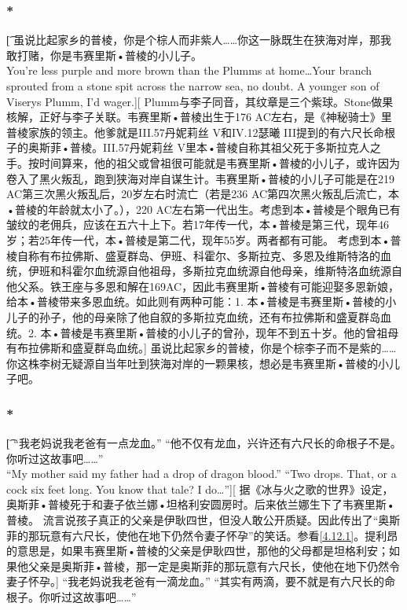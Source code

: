 \documentclass[12pt,a4paper]{article}
\begin{document}
\subsubsection{\color{red}*}\t[	
	虽说比起家乡的普棱，你是个棕人而非紫人……你这一脉既生在狭海对岸，那我敢打赌，你是韦赛里斯•普棱的小儿子。\\
	You're less purple and more brown than the Plumms at home\ldots Your branch sprouted from a stone spit across the narrow sea, no doubt. A younger son of Viserys Plumm, I'd wager.][
	Plumm与李子同音，其纹章是三个紫球。Stone做果核解，正好与李子关联。韦赛里斯•普棱出生于176 AC左右，是《神秘骑士》里普棱家族的领主。他爹就是III.57丹妮莉丝 V和IV.12瑟曦 III提到的有六尺长命根子的奥斯菲•普棱。III.57丹妮莉丝 V里本•普棱自称其祖父死于多斯拉克人之手。按时间算来，他的祖父或曾祖很可能就是韦赛里斯•普棱的小儿子，或许因为卷入了黑火叛乱，跑到狭海对岸自谋生计。韦赛里斯•普棱的小儿子可能是在219 AC第三次黑火叛乱后，20岁左右时流亡（若是236 AC第四次黑火叛乱后流亡，本•普棱的年龄就太小了。），220 AC左右第一代出生。考虑到本•普棱是个眼角已有皱纹的老佣兵，应该在五六十上下。若17年传一代，本•普棱是第三代，现年46岁；若25年传一代，本•普棱是第二代，现年55岁。两者都有可能。
	考虑到本•普棱自称有布拉佛斯、盛夏群岛、伊班、科霍尔、多斯拉克、多恩及维斯特洛的血统，伊班和科霍尔血统源自他祖母，多斯拉克血统源自他母亲，维斯特洛血统源自他父系。铁王座与多恩和解在169AC，因此韦赛里斯•普棱有可能迎娶多恩新娘，给本•普棱带来多恩血统。如此则有两种可能：1. 本•普棱是韦赛里斯•普棱的小儿子的孙子，他的母亲除了他自叙的多斯拉克血统，还有布拉佛斯和盛夏群岛血统。2. 本•普棱是韦赛里斯•普棱的小儿子的曾孙，现年不到五十岁。他的曾祖母有布拉佛斯和盛夏群岛血统。]
	虽说比起家乡的普棱，你是个棕李子而不是紫的……你这株李树无疑源自当年吐到狭海对岸的一颗果核，想必是韦赛里斯•普棱的小儿子吧。
	
\subsubsection{\color{red}*}\t[	
	“我老妈说我老爸有一点龙血。”	“他不仅有龙血，兴许还有六尺长的命根子不是。你听过这故事吧……”\\
	“My mother said my father had a drop of dragon blood.”
	“Two drops. That, or a cock six feet long. You know that tale? I do\ldots”][
	据《冰与火之歌的世界》设定，奥斯菲•普棱死于和妻子依兰娜•坦格利安圆房时。后来依兰娜生下了韦赛里斯•普棱。
	流言说孩子真正的父亲是伊耿四世，但没人敢公开质疑。因此传出了“奥斯菲的那玩意有六尺长，使他在地下仍然令妻子怀孕”的笑话。参看\ref{4.12.1}。提利昂的意思是，如果韦赛里斯•普棱的父亲是伊耿四世，那他的父母都是坦格利安；如果他父亲是奥斯菲•普棱，那一定是奥斯菲的那玩意有六尺长，使他在地下仍然令妻子怀孕。]
	“我老妈说我老爸有一滴龙血。”	“其实有两滴，要不就是有六尺长的命根子。你听过这故事吧……”
	
\end{document}
